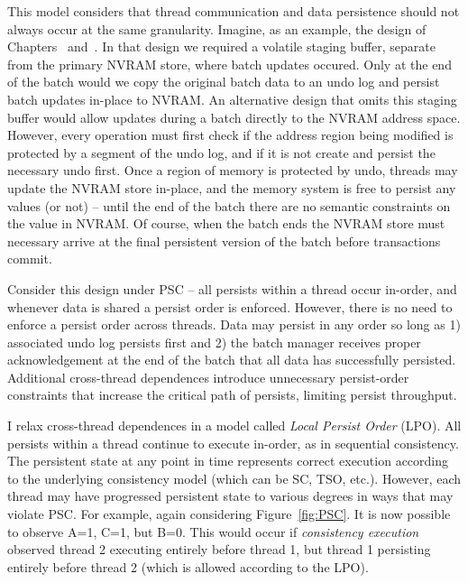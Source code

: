 This model considers that thread communication and data persistence should not always occur at the same granularity.
Imagine, as an example, the \GroupCommit design of Chapters~ and~.
In that design we required a volatile staging buffer, separate from the primary NVRAM store, where batch updates occured.
Only at the end of the batch would we copy the original batch data to an undo log and persist batch updates in-place to NVRAM.
An alternative design that omits this staging buffer would allow updates during a batch directly to the NVRAM address space.
However, every operation must first check if the address region being modified is protected by a segment of the undo log, and if it is not create and persist the necessary undo first.
Once a region of memory is protected by undo, threads may update the NVRAM store in-place, and the memory system is free to persist any values (or not) -- until the end of the batch there are no semantic constraints on the value in NVRAM.
Of course, when the batch ends the NVRAM store must necessary arrive at the final persistent version of the batch before transactions commit.

Consider this design under PSC -- all persists within a thread occur in-order, and whenever data is shared a persist order is enforced.
However, there is no need to enforce a persist order across threads.
Data may persist in any order so long as 1) associated undo log persists first and 2) the batch manager receives proper acknowledgement at the end of the batch that all data has successfully persisted.
Additional cross-thread dependences introduce unnecessary persist-order constraints that increase the critical path of persists, limiting persist throughput.

I relax cross-thread dependences in a model called \emph{Local Persist Order} (LPO).
All persists within a thread continue to execute in-order, as in sequential consistency.
The persistent state at any point in time represents correct execution according to the underlying consistency model (which can be SC, TSO, etc.).
However, each thread may have progressed persistent state to various degrees in ways that may violate PSC.
For example, again considering Figure~\ref{fig:PSC}.
It is now possible to observe A=1, C=1, but B=0.
This would occur if \emph{consistency execution} observed thread 2 executing entirely before thread 1, but thread 1 persisting entirely before thread 2 (which is allowed according to the LPO).


